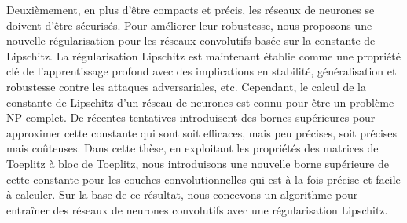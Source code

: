 %
%
%
%
%


Deuxièmement, en plus d'être compacts et précis, les réseaux de neurones se doivent d'être sécurisés.
Pour améliorer leur robustesse, nous proposons une nouvelle régularisation pour les réseaux convolutifs basée sur la constante de Lipschitz.
La régularisation Lipschitz est maintenant établie comme une propriété clé de l'apprentissage profond avec des implications en stabilité, généralisation et robustesse contre les attaques adversariales, etc.
Cependant, le calcul de la constante de Lipschitz d'un réseau de neurones est connu pour être un problème NP-complet.
De récentes tentatives introduisent des bornes supérieures pour approximer cette constante qui sont soit efficaces, mais peu précises, soit précises mais coûteuses.
Dans cette thèse, en exploitant les propriétés des matrices de Toeplitz à bloc de Toeplitz, nous introduisons une nouvelle borne supérieure de cette constante pour les couches convolutionnelles qui est à la fois précise et facile à calculer.
Sur la base de ce résultat, nous concevons un algorithme pour entraîner des réseaux de neurones convolutifs avec une régularisation Lipschitz.


\newpage
\null
\thispagestyle{empty}
\newpage
